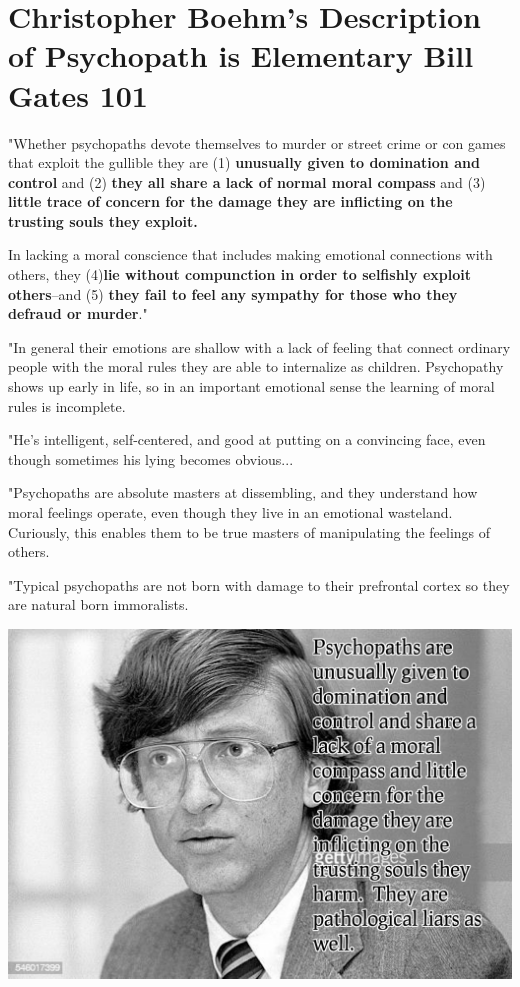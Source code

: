 \documentclass{amsart}
\begin{document}
\section{Christopher Boehm's Description of Psychopath is Elementary Bill Gates 101}

"Whether psychopaths devote themselves to murder or street crime or con games that exploit the gullible they are {(1) \textbf{  unusually given to domination and control}} and {(2) \textbf{ they all share a lack of normal moral compass}} and {(3) \textbf{little trace of concern for the damage they are inflicting on the trusting souls they exploit.}}

In lacking a moral conscience that includes making emotional connections with others, they {(4)\textbf{lie without compunction in order to selfishly exploit others}}--and {(5) \textbf{they fail to feel any sympathy for those who they defraud or murder}}."

"In general their emotions are shallow with a lack of feeling that connect ordinary people with the moral rules they are able to internalize as children.  Psychopathy shows up early in life, so in an important emotional sense the learning of moral rules is incomplete.

"He's intelligent, self-centered, and good at putting on a convincing face, even though sometimes his lying becomes obvious...

"Psychopaths are absolute masters at dissembling, and they understand how moral feelings operate, even though they live in an emotional wasteland.  Curiously, this enables them to be true masters of manipulating the feelings of others.

"Typical psychopaths are not born with damage to their prefrontal cortex so they are natural born immoralists.  

\includegraphics[scale=0.6]{bg-psychopath.jpg}
\end{document}
